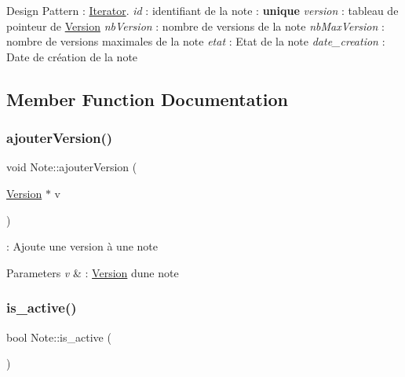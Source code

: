 Design Pattern \+: \hyperlink{class_iterator}{Iterator}. {\itshape id} \+: identifiant de la note \+: {\bfseries unique} {\itshape version} \+: tableau de pointeur de \hyperlink{class_version}{Version} {\itshape nb\+Version} \+: nombre de versions de la note {\itshape nb\+Max\+Version} \+: nombre de versions maximales de la note {\itshape etat} \+: Etat de la note {\itshape date\+\_\+creation} \+: Date de création de la note 

\subsection{Member Function Documentation}
\mbox{\label{class_note_a6a150fba840245d5c99c058e3457e775}} 
\subsubsection{\texorpdfstring{ajouter\+Version()}{ajouterVersion()}}
{\footnotesize\ttfamily void Note\+::ajouter\+Version (\begin{DoxyParamCaption}\item[{\hyperlink{class_version}{Version} $\ast$}]{v }\end{DoxyParamCaption})}



\+: Ajoute une version à une note 


\begin{DoxyParams}{Parameters}
{\em v} & \+: \hyperlink{class_version}{Version} d\textquotesingle{}une note \\
\hline
\end{DoxyParams}
\mbox{\label{class_note_aca74abbfeb1ff6bba66db5e81f5f622e}} 
\subsubsection{\texorpdfstring{is\+\_\+active()}{is\_active()}}
{\footnotesize\ttfamily bool Note\+::is\+\_\+active (\begin{DoxyParamCaption}{ }\end{DoxyParamCaption})\hspace{0.3cm}{\ttfamily [inline]}}



